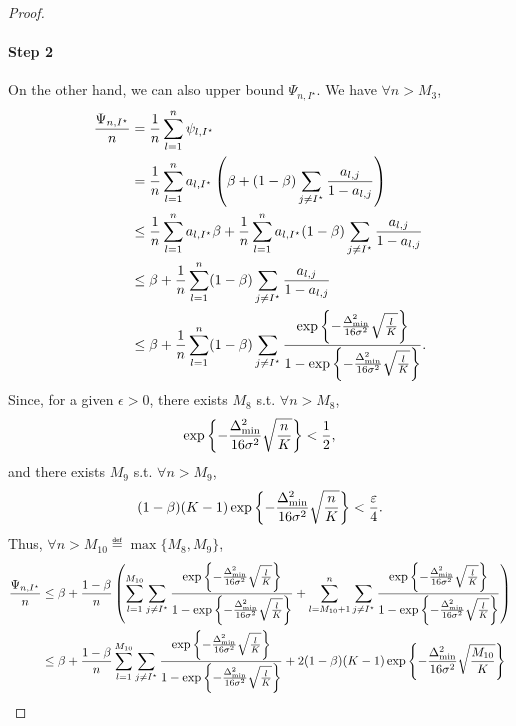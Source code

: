 \begin{proof}
    \paragraph{Step 2} On the other hand, we can also upper bound $\Psi_{n,I^\star}$. We have $\forall n > M_3$,
    \begin{align*}
        \frac{\Psi_{n,I^\star}}{n} &= \frac{1}{n}\sum_{l=1}^{n}\psi_{l,I^\star}\\
                             &= \frac{1}{n}\sum_{l=1}^{n}a_{l,I^\star}\left( \beta + (1-\beta)\sum_{j\neq I^\star}\frac{a_{l,j}}{1-a_{l,j}} \right)\\
                             &\leq \frac{1}{n}\sum_{l=1}^{n}a_{l,I^\star}\beta + \frac{1}{n}\sum_{l=1}^{n}a_{l,I^\star}(1-\beta)\sum_{j\neq I^\star}\frac{a_{l,j}}{1-a_{l,j}}\\
                             &\leq \beta + \frac{1}{n}\sum_{l=1}^{n}(1-\beta)\sum_{j\neq I^\star}\frac{a_{l,j}}{1-a_{l,j}}\\
                             &\leq \beta + \frac{1}{n}\sum_{l=1}^{n}(1-\beta)\sum_{j\neq I^\star}\frac{\exp\left\{-\frac{\Delta_{\text{min}}^2}{16\sigma^2}\sqrt{\frac{l}{K}}\right\}}{1-\exp\left\{-\frac{\Delta_{\text{min}}^2}{16\sigma^2}\sqrt{\frac{l}{K}}\right\}}.
    \end{align*}
    Since, for a given $\epsilon > 0$, there exists $M_8$ s.t. $\forall n > M_8$,
    \[
        \exp\left\{-\frac{\Delta_{\text{min}}^2}{16\sigma^2}\sqrt{\frac{n}{K}}\right\} < \frac{1}{2},
    \]
    and there exists $M_9$ s.t. $\forall n > M_9$,
    \[
        (1-\beta)(K-1)\exp\left\{-\frac{\Delta_{\text{min}}^2}{16\sigma^2}\sqrt{\frac{n}{K}}\right\} < \frac{\varepsilon}{4}.
    \]
    Thus, $\forall n > M_{10} \eqdef \max\{M_8,M_9\}$,
    \begin{align*}
        \frac{\Psi_{n,I^\star}}{n} &\leq \beta + \frac{1-\beta}{n}\left(\sum_{l=1}^{M_{10}}\sum_{j\neq I^\star}\frac{\expp{-\frac{\Delta_{\text{min}}^2}{16\sigma^2}\sqrt{\frac{l}{K}}}}{1-\expp{-\frac{\Delta_{\text{min}}^2}{16\sigma^2}\sqrt{\frac{l}{K}}}} + \sum_{l=M_{10}+1}^{n}\sum_{j\neq I^\star}\frac{\expp{-\frac{\Delta_{\text{min}}^2}{16\sigma^2}\sqrt{\frac{l}{K}}}}{1-\expp{-\frac{\Delta_{\text{min}}^2}{16\sigma^2}\sqrt{\frac{l}{K}}}}\right)\\
                             &\leq \beta + \frac{1-\beta}{n}\sum_{l=1}^{M_{10}}\sum_{j\neq I^\star}\frac{\expp{-\frac{\Delta_{\text{min}}^2}{16\sigma^2}\sqrt{\frac{l}{K}}}}{1-\expp{-\frac{\Delta_{\text{min}}^2}{16\sigma^2}\sqrt{\frac{l}{K}}}} + 2(1-\beta)(K-1)\expp{-\frac{\Delta_{\text{min}}^2}{16\sigma^2}\sqrt{\frac{M_{10}}{K}}}\\

\end{align*}
\end{proof}
